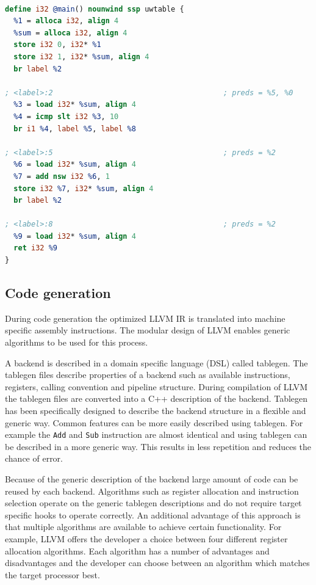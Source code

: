 \lstset{numbers=none, captionpos=b}
\begin{lstlisting}[language=llvm,caption={LLVM Intermediate representation},label=lst:LLVM_IR]

define i32 @main() nounwind ssp uwtable {
  %1 = alloca i32, align 4
  %sum = alloca i32, align 4
  store i32 0, i32* %1
  store i32 1, i32* %sum, align 4
  br label %2

; <label>:2                                       ; preds = %5, %0
  %3 = load i32* %sum, align 4
  %4 = icmp slt i32 %3, 10
  br i1 %4, label %5, label %8

; <label>:5                                       ; preds = %2
  %6 = load i32* %sum, align 4
  %7 = add nsw i32 %6, 1
  store i32 %7, i32* %sum, align 4
  br label %2

; <label>:8                                       ; preds = %2
  %9 = load i32* %sum, align 4
  ret i32 %9
}

\end{lstlisting}

\subsection{Code generation}
During code generation the optimized LLVM IR is translated into machine specific assembly instructions. The modular design of LLVM enables generic algorithms to be used for this process. 

A backend is described in a domain specific language (DSL) called tablegen. The tablegen files describe properties of a backend such as available instructions, registers, calling convention and pipeline structure. During compilation of LLVM the tablegen files are converted into a C++ description of the backend. Tablegen has been specifically designed to describe the backend structure in a flexible and generic way. Common features can be more easily described using tablegen. For example the \texttt{Add} and \texttt{Sub} instruction are almost identical and using tablegen can be described in a more generic way. This results in less repetition and reduces the chance of error.

Because of the generic description of the backend large amount of code can be reused by each backend. Algorithms such as register allocation and instruction selection operate on the generic tablegen descriptions and do not require target specific hooks to operate correctly. An additional advantage of this approach is that multiple algorithms are available to achieve certain functionality. For example, LLVM offers the developer a choice between four different register allocation algorithms. Each algorithm has a number of advantages and disadvantages and the developer can choose between an algorithm which matches the target processor best.

